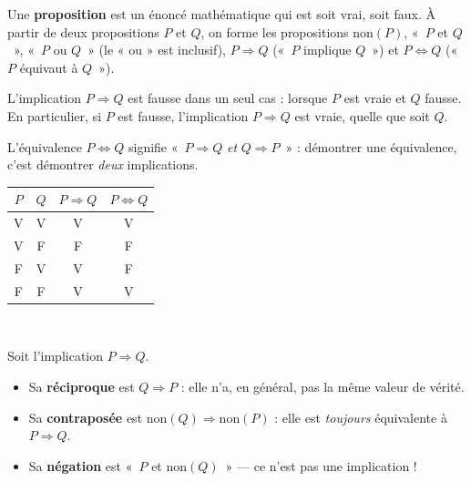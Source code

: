 
\begin{definition}[Proposition]
Une \textbf{proposition} est un énoncé mathématique qui est soit vrai, soit faux.
À partir de deux propositions $P$ et $Q$, on forme les propositions
$\text{non}(P)$, «~$P$ et $Q$~», «~$P$ ou $Q$~» (le « ou » est inclusif),
$P\Rightarrow Q$ («~$P$ implique $Q$~») et $P\Leftrightarrow Q$
(«~$P$ équivaut à $Q$~»).
\end{definition}

\noindent
\begin{minipage}[c]{0.56\linewidth}
L'implication $P\Rightarrow Q$ est fausse dans un seul cas : lorsque $P$ est
vraie et $Q$ fausse. En particulier, si $P$ est fausse, l'implication
$P\Rightarrow Q$ est vraie, quelle que soit $Q$.\par\vspace{2mm}
L'équivalence $P\Leftrightarrow Q$ signifie «~$P\Rightarrow Q$ \emph{et}
$Q\Rightarrow P$~» : démontrer une équivalence, c'est démontrer
\emph{deux} implications.
\end{minipage}\hfill
\begin{minipage}[c]{0.4\linewidth}
\centering
{\renewcommand{\arraystretch}{1.3}%
\begin{tabular}{@{}cc|cc@{}}
\toprule
$P$ & $Q$ & $P\Rightarrow Q$ & $P\Leftrightarrow Q$ \\
\midrule
V & V & V & V \\
V & F & \textcolor{otRed}{F} & F \\
F & V & V & F \\
F & F & V & V \\
\bottomrule
\end{tabular}}\\[1mm]
\end{minipage}

\begin{definition}
Soit l'implication $P\Rightarrow Q$.
\begin{itemize}[label={\color{otNavy}\textbullet},leftmargin=1.4em,itemsep=0.6mm,topsep=0.8mm]
  \item Sa \textbf{réciproque} est $Q\Rightarrow P$ : elle n'a, en général, pas la même valeur de vérité.
  \item Sa \textbf{contraposée} est $\text{non}(Q)\Rightarrow\text{non}(P)$ :
    elle est \emph{toujours} équivalente à $P\Rightarrow Q$.
  \item Sa \textbf{négation} est «~$P$ et $\text{non}(Q)$~» — ce n'est pas une implication !
\end{itemize}
\end{definition}

